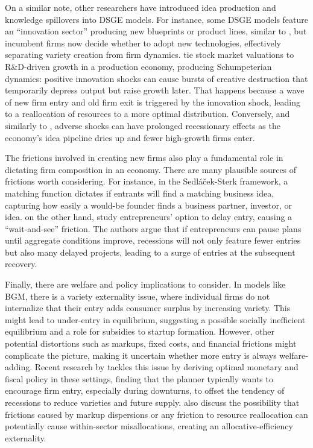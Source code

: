 \documentclass[a4paper,12pt]{article} %
\numberwithin{equation}{section} %
\numberwithin{figure}{section}
\numberwithin{table}{section}
\begin{document}
On a similar note, other researchers have introduced idea production and knowledge spillovers into DSGE models. For instance,
some DSGE models feature an ``innovation sector'' producing new blueprints or product lines, similar to \textcite{bilbiie2012endogenous},
but incumbent firms now decide whether to adopt new technologies, effectively separating variety creation from firm dynamics.
\textcite{kung2015innovation} tie stock market valuations to R\&D-driven growth in a production economy, producing Schumpeterian dynamics: 
positive innovation shocks can cause bursts of creative destruction that temporarily depress output but raise growth later. That happens 
because a wave of new firm entry and old firm exit is triggered by the innovation shock, leading to a reallocation of resources to a more 
optimal distribution. Conversely, and similarly to \textcite{sedlavcek2017growth}, adverse shocks can have prolonged recessionary effects
as the economy's idea pipeline dries up and fewer high-growth firms enter.


The frictions involved in creating new firms also play a fundamental role in dictating firm composition in an economy. There are many plausible 
sources of frictions worth considering. For instance, in the Sedláček-Sterk framework, a matching function dictates if entrants will find a matching
business idea, capturing how easily a would-be founder finds a business partner, investor, or idea. \textcite{vardishvili2023entry} on the other hand,
study entrepreneurs' option to delay entry, causing a ``wait-and-see'' friction. The authors argue that if entrepreneurs can pause plans until aggregate
conditions improve, recessions will not only feature fewer entries but also many delayed projects, leading to a surge of entries at the subsequent recovery.

Finally, there are welfare and policy implications to consider. In models like BGM, there is a variety externality issue, where individual firms do not internalize
that their entry adds consumer surplus by increasing variety. This might lead to under-entry in equilibrium, suggesting a possible socially inefficient equilibrium 
and a role for subsidies to startup formation. However, other potential distortions such as markups, fixed costs, and financial frictions might complicate the picture, 
making it uncertain whether more entry is always welfare-adding. Recent research by \textcite{bilbiie2019monopoly} tackles this issue by deriving optimal monetary
and fiscal policy in these settings, finding that the planner typically wants to encourage firm entry, especially during downturns, to offset the tendency of recessions
to reduce varieties and future supply. \textcite{baqaee2020productivity} also discuss the possibility that frictions caused by
markup dispersions or any friction to resource reallocation can potentially cause within-sector misallocations, creating an allocative-efficiency externality.
\end{document}
